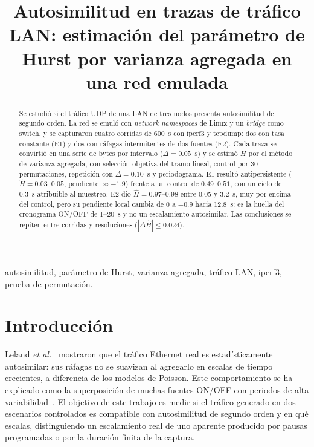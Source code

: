 \documentclass[conference,letterpaper]{IEEEtran}
\newcommand{\Hhat}{\hat{H}}
\begin{document}
\title{Autosimilitud en trazas de tráfico LAN: estimación del parámetro de Hurst por varianza agregada en una red emulada}

\author{
\and
{}
}

\maketitle

\begin{abstract}
Se estudió si el tráfico UDP de una LAN de tres nodos presenta autosimilitud de segundo orden. La red se emuló con \emph{network namespaces} de Linux y un \emph{bridge} como switch, y se capturaron cuatro corridas de 600~s con iperf3 y tcpdump: dos con tasa constante (E1) y dos con ráfagas intermitentes de dos fuentes (E2). Cada traza se convirtió en una serie de bytes por intervalo ($\Delta = 0.05$~s) y se estimó $H$ por el método de varianza agregada, con selección objetiva del tramo lineal, control por 30 permutaciones, repetición con $\Delta = 0.10$~s y periodograma. E1 resultó antipersistente ($\Hhat = 0.03$--$0.05$, pendiente $\approx -1.9$) frente a un control de $0.49$--$0.51$, con un ciclo de 0.3~s atribuible al muestreo. E2 dio $\Hhat = 0.97$--$0.98$ entre 0.05 y 3.2~s, muy por encima del control, pero su pendiente local cambia de $0$ a $-0.9$ hacia 12.8~s: es la huella del cronograma ON/OFF de 1--20~s y no un escalamiento autosimilar. Las conclusiones se repiten entre corridas y resoluciones ($|\Delta\Hhat| \le 0.024$).
\end{abstract}

\begin{IEEEkeywords}
autosimilitud, parámetro de Hurst, varianza agregada, tráfico LAN, iperf3, prueba de permutación.
\end{IEEEkeywords}

\section{Introducción}
Leland \emph{et al.}~\cite{leland94} mostraron que el tráfico Ethernet real es estadísticamente autosimilar: sus ráfagas no se suavizan al agregarlo en escalas de tiempo crecientes, a diferencia de los modelos de Poisson. Este comportamiento se ha explicado como la superposición de muchas fuentes ON/OFF con periodos de alta variabilidad~\cite{willinger97}. El objetivo de este trabajo es medir si el tráfico generado en dos escenarios controlados es compatible con autosimilitud de segundo orden y en qué escalas, distinguiendo un escalamiento real de uno aparente producido por pausas programadas o por la duración finita de la captura.
\end{document}
